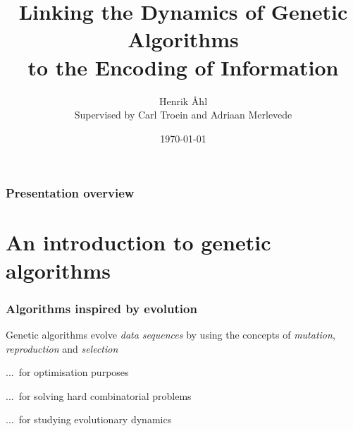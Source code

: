\documentclass{beamer}
\title
{
   Linking the Dynamics of Genetic Algorithms \\
   to the Encoding of Information
}
\date{\today}
\author
{
   Henrik \r{A}hl\\
   \small{Supervised by Carl Troein and Adriaan Merlevede}
}
\theoremstyle{plain}
\theoremstyle{definition}
\begin{document}
\begin{frame}
	\titlepage
\end{frame}

\begin{frame}
\frametitle{Presentation overview}
\tableofcontents{}
\end{frame}


\section{An introduction to genetic algorithms}

\begin{frame}
	\frametitle{Algorithms inspired by evolution}
      Genetic algorithms evolve \textit{data sequences} by using the concepts of
      \textit{mutation}, \textit{reproduction} and \textit{selection}

      ...~for optimisation purposes
      
      ...~for solving hard combinatorial problems

      ...~for studying evolutionary dynamics

\end{frame}
\end{document}
